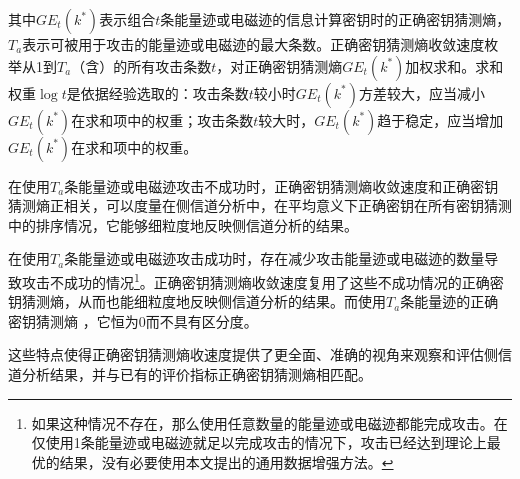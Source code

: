 {	\noindent 其中$GE_t(k^*)$表示组合$t$条能量迹或电磁迹的信息计算密钥时的正确密钥猜测熵，$T_a$表示可被用于攻击的能量迹或电磁迹的最大条数。正确密钥猜测熵收敛速度枚举从1到$T_a$（含）的所有攻击条数$t$，对正确密钥猜测熵$GE_t(k^*)$加权求和。求和权重$\log t$是依据经验选取的：攻击条数$t$较小时$GE_t(k^*)$方差较大，应当减小$GE_t(k^*)$在求和项中的权重；攻击条数$t$较大时，$GE_t(k^*)$趋于稳定，应当增加$GE_t(k^*)$在求和项中的权重。
	
	在使用$T_a$条能量迹或电磁迹攻击不成功时，正确密钥猜测熵收敛速度和正确密钥猜测熵正相关，可以度量在侧信道分析中，在平均意义下正确密钥在所有密钥猜测中的排序情况，它能够细粒度地反映侧信道分析的结果。
	
	在使用$T_a$条能量迹或电磁迹攻击成功时，存在减少攻击能量迹或电磁迹的数量导致攻击不成功的情况\footnote{如果这种情况不存在，那么使用任意数量的能量迹或电磁迹都能完成攻击。在仅使用1条能量迹或电磁迹就足以完成攻击的情况下，攻击已经达到理论上最优的结果，没有必要使用本文提出的通用数据增强方法。}。正确密钥猜测熵收敛速度复用了这些不成功情况的正确密钥猜测熵，从而也能细粒度地反映侧信道分析的结果。而使用$T_a$条能量迹的正确密钥猜测熵 ，它恒为0而不具有区分度。
	
	这些特点使得正确密钥猜测熵收速度提供了更全面、准确的视角来观察和评估侧信道分析结果，并与已有的评价指标正确密钥猜测熵相匹配。
	
}
